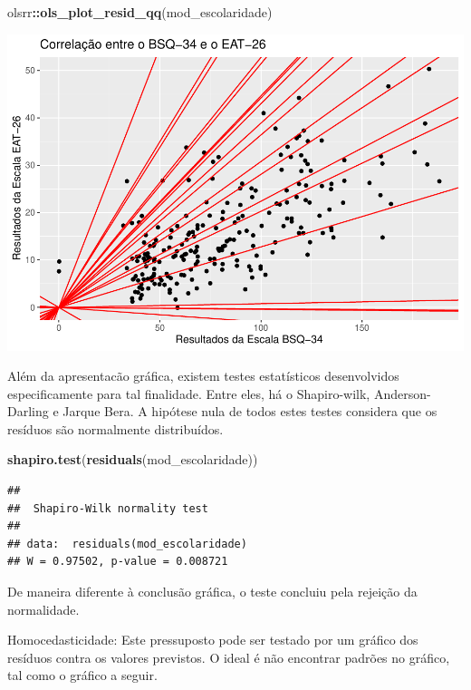 \documentclass[
]{book}
\newenvironment{Shaded}{\begin{snugshade}}{\end{snugshade}}
\newcommand{\KeywordTok}[1]{\textcolor[rgb]{0.13,0.29,0.53}{\textbf{#1}}}
\newcommand{\NormalTok}[1]{#1}
\newcommand{\OperatorTok}[1]{\textcolor[rgb]{0.81,0.36,0.00}{\textbf{#1}}}
\begin{document}
\begin{Shaded}
\begin{Highlighting}[]
\NormalTok{olsrr}\OperatorTok{::}\KeywordTok{ols_plot_resid_qq}\NormalTok{(mod_escolaridade)}
\end{Highlighting}
\end{Shaded}

\begin{center}\includegraphics{gitbook-demo_files/figure-latex/unnamed-chunk-81-1} \end{center}

Além da apresentacão gráfica, existem testes estatísticos desenvolvidos especificamente para tal finalidade. Entre eles, há o Shapiro-wilk, Anderson-Darling e Jarque Bera. A hipótese nula de todos estes testes considera que os resíduos são normalmente distribuídos.

\begin{Shaded}
\begin{Highlighting}[]
\KeywordTok{shapiro.test}\NormalTok{(}\KeywordTok{residuals}\NormalTok{(mod_escolaridade))}
\end{Highlighting}
\end{Shaded}

\begin{verbatim}
## 
##  Shapiro-Wilk normality test
## 
## data:  residuals(mod_escolaridade)
## W = 0.97502, p-value = 0.008721
\end{verbatim}

De maneira diferente à conclusão gráfica, o teste concluiu pela rejeição da normalidade.

Homocedasticidade: Este pressuposto pode ser testado por um gráfico dos resíduos contra os valores previstos. O ideal é não encontrar padrões no gráfico, tal como o gráfico a seguir.
\end{document}
